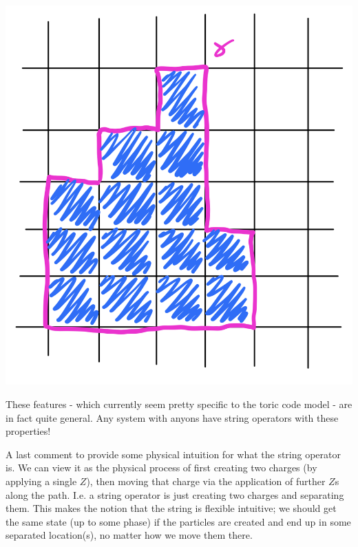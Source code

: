 \begin{center}
    \includegraphics[scale=0.4]{Lectures/Images/lec1-loopstringop.png}
\end{center}


These features - which currently seem pretty specific to the toric code model - are in fact quite general. Any system with anyons have string operators with these properties!

A last comment to provide some physical intuition for what the string operator is. We can view it as the physical process of first creating two charges (by applying a single $Z$), then moving that charge via the application of further $Z$s along the path. I.e. a string operator is just creating two charges and separating them. This makes the notion that the string is flexible intuitive; we should get the same state (up to some phase) if the particles are created and end up in some separated location(s), no matter how we move them there.